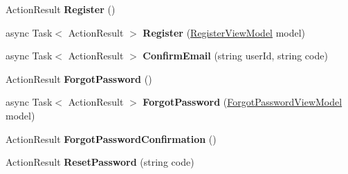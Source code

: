 \begin{DoxyCompactItemize}
\item 
Action\+Result {\bfseries Register} ()\hypertarget{class_cloud_bread_admin_web_1_1_controllers_1_1_account_controller_a432c910f111e765a65da14282a223b23}{}\label{class_cloud_bread_admin_web_1_1_controllers_1_1_account_controller_a432c910f111e765a65da14282a223b23}

\item 
async Task$<$ Action\+Result $>$ {\bfseries Register} (\hyperlink{class_cloud_bread_admin_web_1_1_models_1_1_register_view_model}{Register\+View\+Model} model)\hypertarget{class_cloud_bread_admin_web_1_1_controllers_1_1_account_controller_aabe75cc491c52635d865e972992cf1d9}{}\label{class_cloud_bread_admin_web_1_1_controllers_1_1_account_controller_aabe75cc491c52635d865e972992cf1d9}

\item 
async Task$<$ Action\+Result $>$ {\bfseries Confirm\+Email} (string user\+Id, string code)\hypertarget{class_cloud_bread_admin_web_1_1_controllers_1_1_account_controller_a72e5d1891d8ecfd314e94e5c1b087da1}{}\label{class_cloud_bread_admin_web_1_1_controllers_1_1_account_controller_a72e5d1891d8ecfd314e94e5c1b087da1}

\item 
Action\+Result {\bfseries Forgot\+Password} ()\hypertarget{class_cloud_bread_admin_web_1_1_controllers_1_1_account_controller_aec786f07cb6404c6c604f8bdb0ebf146}{}\label{class_cloud_bread_admin_web_1_1_controllers_1_1_account_controller_aec786f07cb6404c6c604f8bdb0ebf146}

\item 
async Task$<$ Action\+Result $>$ {\bfseries Forgot\+Password} (\hyperlink{class_cloud_bread_admin_web_1_1_models_1_1_forgot_password_view_model}{Forgot\+Password\+View\+Model} model)\hypertarget{class_cloud_bread_admin_web_1_1_controllers_1_1_account_controller_a00ae9dd6283bd55904b623116df807d5}{}\label{class_cloud_bread_admin_web_1_1_controllers_1_1_account_controller_a00ae9dd6283bd55904b623116df807d5}

\item 
Action\+Result {\bfseries Forgot\+Password\+Confirmation} ()\hypertarget{class_cloud_bread_admin_web_1_1_controllers_1_1_account_controller_ae147dc905e1ffa42024972baea8eafe7}{}\label{class_cloud_bread_admin_web_1_1_controllers_1_1_account_controller_ae147dc905e1ffa42024972baea8eafe7}

\item 
Action\+Result {\bfseries Reset\+Password} (string code)\hypertarget{class_cloud_bread_admin_web_1_1_controllers_1_1_account_controller_a2e497c6b396e8aaaf8ae980c8af75147}{}\label{class_cloud_bread_admin_web_1_1_controllers_1_1_account_controller_a2e497c6b396e8aaaf8ae980c8af75147}


\end{DoxyCompactItemize}
